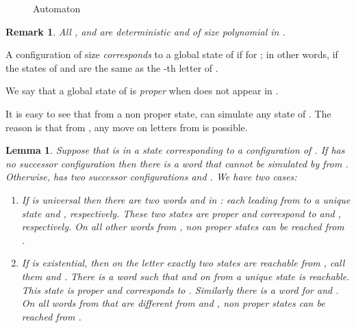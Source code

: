 \documentclass{LMCS}
\theoremstyle{plain}\newtheorem{remark}{Remark}
\theoremstyle{plain}\newtheorem{lemma}[thm]{Lemma}
\begin{document}
\begin{figure}[htb]
  
  \caption{Automaton }
  \label{fig:autK}
\end{figure}

\begin{remark}
  All ,  and  are deterministic and of size
  polynomial in .
\end{remark}


\begin{defi}\label{df:cor}
  A configuration  of size  \emph{corresponds} to a global state
     of  if   for ;
    in other words, if the states of  and  are the
    same as the -th letter of .
\end{defi}

\begin{defi}
  We say that a global state  of  is \emph{proper}
  when  does not appear in .
\end{defi}

It is easy to see that from a non proper state,  can simulate 
any state of . The reason is that from ,
 any move on letters from  is possible.

\begin{lemma}\label{lemma:mainexp}
  Suppose that  is in a state  corresponding to a
  configuration  of . If  has no successor configuration
  then there is a word  that cannot be simulated by   from . Otherwise,  has two
  successor configurations  and . We have two cases:
  \begin{enumerate}[]

  \item If  is universal then there are two words  and  in
    : each leading from  to a unique state  and
    , respectively. These two states are proper and
    correspond to  and , respectively. On all other words
    from , non proper states can be reached from .

  \item If  is existential, then on the letter  exactly
    two states are reachable from , call them  and
    . There is a word  such that 
    and on  from  a unique state is reachable. This state
    is proper and corresponds to . Similarly there is a word 
    for  and . On all words from  that are different from  and , non proper states can be reached from
    .
  \end{enumerate}
\end{lemma}
\end{document}

